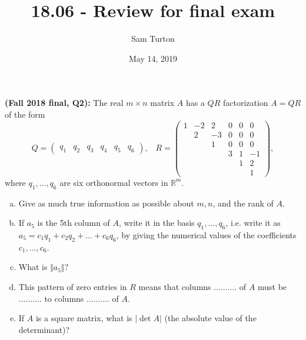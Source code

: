 \documentclass[11pt]{article}
\title{18.06 - Review for final exam}
\author{Sam Turton}
\date{May 14, 2019}
\begin{document}
\maketitle

\noindent \textbf{(Fall 2018 final, Q2):} The real $m \times n$ matrix $A$ has a $QR$ factorization $A = QR$ of the form
$$Q = \begin{pmatrix} q_1 & q_2 & q_3 & q_4 & q_5 & q_6 \end{pmatrix}, \;\;\;
    R = \begin{pmatrix} 1 & -2 & 2 & 0 & 0 & 0 \\ & 2 & -3 & 0 & 0 & 0 \\ & & 1 & 0 & 0 & 0 \\ & & & 3 & 1 & -1 \\ & & & & 1 & 2 \\ & & & & & 1 \end{pmatrix},$$
where $q_1, ... , q_6$ are six orthonormal vectors in $\mathbb{R}^m$.
\begin{enumerate}[(a)]
\item Give as much true information as possible about $m, n$, and the rank of $A$.
\item If $a_5$ is the 5th column of $A$, write it in the basis $q_1, ... , q_6$, i.e. write it as $a_5 = c_1q_1 + c_2q_2 + ... + c_6q_6$, by giving the numerical values of the coefficients $c_1,... , c_6$.
\item  What is $\Vert a_5 \Vert$?
\item This pattern of zero entries in $R$ means that columns .......... of $A$ must be .......... to columns .......... of $A$.
\item If $A$ is a square matrix, what is $\vert \det A \vert$ (the absolute value of the determinant)?
\end{enumerate}

\newpage
\end{document}

